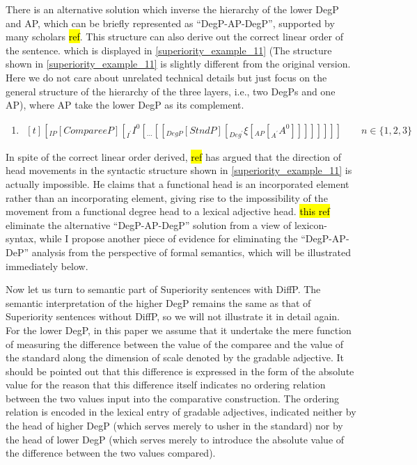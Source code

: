 \documentclass{ctexart}
\begin{document}
There is an alternative solution which inverse the hierarchy of the lower DegP and AP, which can be briefly represented as ``DegP-AP-DegP'', supported by many scholars \hl{ref}. This structure can also derive out the correct linear order of the sentence. which is displayed in \ref{superiority_example_11} (The structure shown in \ref{superiority_example_11} is slightly different from the original version. Here we do not care about unrelated technical details but just focus on the general structure of the hierarchy of the three layers, i.e., two DegPs and one AP), where AP take the lower DegP as its complement.

\begin{enumerate}
    \item \label{superiority_example_11}
    $\begin{aligned}[t]
        [_{IP} [CompareeP] [_{I^{\prime}} I^{0} [_{...} [[_{DegP} [StndP] [_{Deg^{\prime}} \xi [_{AP} [_{A^{\prime}} A^{0}]]]]]]]] \qquad n \in \{1, 2, 3\}
    \end{aligned}$
\end{enumerate}

In spite of the correct linear order derived, \hl{ref} has argued that the direction of head movements in the syntactic structure shown in \ref{superiority_example_11} is actually impossible. He claims that a functional head is an incorporated element rather than an incorporating element, giving rise to the impossibility of the movement from a functional degree head to a lexical adjective head. \hl{this ref} eliminate the alternative ``DegP-AP-DegP'' solution from a view of lexicon-syntax, while I propose another piece of evidence for eliminating the ``DegP-AP-DeP'' analysis from the perspective of formal semantics, which will be illustrated immediately below.

Now let us turn to semantic part of Superiority sentences with DiffP. The semantic interpretation of the higher DegP remains the same as that of Superiority sentences without DiffP, so we will not illustrate it in detail again. For the lower DegP, in this paper we assume that it undertake the mere function of measuring the difference between the value of the comparee and the value of  the standard along the dimension of scale denoted by the gradable adjective. It should be pointed out that this difference is expressed in the form of the absolute value for the reason that this difference itself indicates no ordering relation between the two values input into the comparative construction.  The ordering relation is encoded in the lexical entry of gradable adjectives,  indicated neither by the head of higher DegP (which serves merely to usher in the standard) nor by the head of lower DegP (which serves merely to introduce the absolute value of the difference between the two values compared). 
\end{document}
